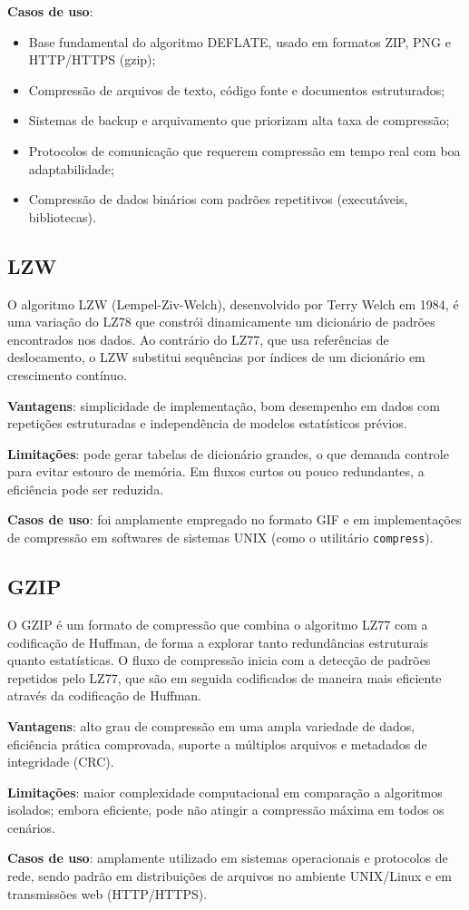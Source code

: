 \textbf{Casos de uso}:
\begin{itemize}
    \item Base fundamental do algoritmo DEFLATE, usado em formatos ZIP, PNG e HTTP/HTTPS (gzip);
    \item Compressão de arquivos de texto, código fonte e documentos estruturados;
    \item Sistemas de backup e arquivamento que priorizam alta taxa de compressão;
    \item Protocolos de comunicação que requerem compressão em tempo real com boa adaptabilidade;
    \item Compressão de dados binários com padrões repetitivos (executáveis, bibliotecas).
\end{itemize}


\subsection{LZW}

O algoritmo LZW (Lempel-Ziv-Welch), desenvolvido por Terry Welch em 1984, é uma variação do LZ78 que constrói dinamicamente um dicionário de padrões encontrados nos dados. Ao contrário do LZ77, que usa referências de deslocamento, o LZW substitui sequências por índices de um dicionário em crescimento contínuo.

\textbf{Vantagens}: simplicidade de implementação, bom desempenho em dados com repetições estruturadas e independência de modelos estatísticos prévios.  

\textbf{Limitações}: pode gerar tabelas de dicionário grandes, o que demanda controle para evitar estouro de memória. Em fluxos curtos ou pouco redundantes, a eficiência pode ser reduzida.  

\textbf{Casos de uso}: foi amplamente empregado no formato GIF e em implementações de compressão em softwares de sistemas UNIX (como o utilitário \texttt{compress}).

\subsection{GZIP}

O GZIP é um formato de compressão que combina o algoritmo LZ77 com a codificação de Huffman, de forma a explorar tanto redundâncias estruturais quanto estatísticas. O fluxo de compressão inicia com a detecção de padrões repetidos pelo LZ77, que são em seguida codificados de maneira mais eficiente através da codificação de Huffman.

\textbf{Vantagens}: alto grau de compressão em uma ampla variedade de dados, eficiência prática comprovada, suporte a múltiplos arquivos e metadados de integridade (CRC).  

\textbf{Limitações}: maior complexidade computacional em comparação a algoritmos isolados; embora eficiente, pode não atingir a compressão máxima em todos os cenários.  

\textbf{Casos de uso}: amplamente utilizado em sistemas operacionais e protocolos de rede, sendo padrão em distribuições de arquivos no ambiente UNIX/Linux e em transmissões web (HTTP/HTTPS).

